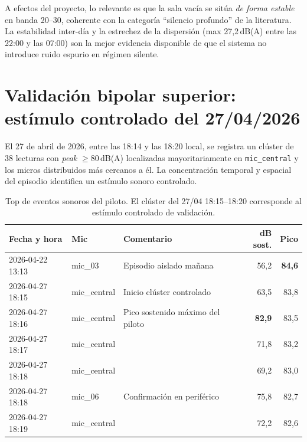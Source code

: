 \documentclass[11pt,a4paper,openany]{report}
\begin{document}
A efectos del proyecto, lo relevante es que la sala vac\'ia se sit\'ua \emph{de forma estable} en banda 20--30, coherente con la categor\'ia ``silencio profundo'' de la literatura. La estabilidad inter-d\'ia y la estrechez de la dispersi\'on (max 27,2\,dB(A) entre las 22:00 y las 07:00) son la mejor evidencia disponible de que el sistema no introduce ruido espurio en r\'egimen silente.

\section{Validaci\'on bipolar superior: est\'imulo controlado del 27/04/2026}
\label{sec:val-superior}

El 27 de abril de 2026, entre las 18:14 y las 18:20 local, se registra un cl\'uster de 38 lecturas con \emph{peak} $\geq 80$\,dB(A) localizadas mayoritariamente en \texttt{mic\_central} y los micros distribuidos m\'as cercanos a \'el. La concentraci\'on temporal y espacial del episodio identifica un est\'imulo sonoro controlado.

\begin{table}[H]
\centering
{}
\begin{tabularx}{\textwidth}{l l X r r}
\toprule
\rowcolor{TableHead}
\textbf{Fecha y hora} & \textbf{Mic} & \textbf{Comentario} & \textbf{dB sost.} & \textbf{Pico} \\ \midrule
2026-04-22 13:13 & mic\_03      & Episodio aislado ma\~nana & 56,2 & \textbf{84,6} \\
2026-04-27 18:15 & mic\_central & Inicio cl\'uster controlado & 63,5 & 83,8 \\
2026-04-27 18:16 & mic\_central & Pico sostenido m\'aximo del piloto & \textbf{82,9} & 83,5 \\
2026-04-27 18:17 & mic\_central &                              & 71,8 & 83,2 \\
2026-04-27 18:18 & mic\_central &                              & 69,2 & 83,0 \\
2026-04-27 18:18 & mic\_06      & Confirmaci\'on en perif\'erico & 75,8 & 82,7 \\
2026-04-27 18:19 & mic\_central &                              & 72,2 & 82,6 \\ \bottomrule
\end{tabularx}
\caption{Top de eventos sonoros del piloto. El cl\'uster del 27/04 18:15--18:20 corresponde al est\'imulo controlado de validaci\'on.}
\end{table}
\end{document}
